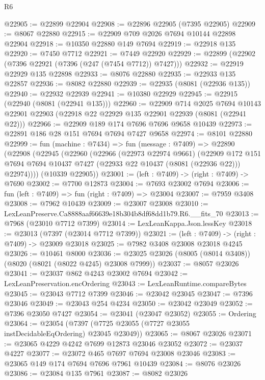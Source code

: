 \begin{lexlean}{R6}
\begin{coremodule}
@22905 := @22899 @22904
@22908 := @22896 @22905 (@7395 @22905)
@22909 := @8067 @22880
@22915 := @22909 @709 @2026 @7694 @10144 @22898 @22904
@22918 := @10350 @22880 @149 @7694
@22919 := @22918 @135
@22920 := @7450 @7712
@22921 := @7449 @22920
@22929 := @22899 (@22902 (@7396 @22921 (@7396 (@247 (@7454 @7712)) @7427)))
@22932 := @22919 @22929 @135 @22898
@22933 := @8076 @22880
@22935 := @22933 @135 @22857
@22936 := @8082 @22880
@22939 := @22935 (@8081 (@22936 @135))
@22940 := @22932 @22939
@22941 := @10380 @22929
@22945 := @22915 (@22940 (@8081 (@22941 @135)))
@22960 := @22909
    @714
    @2025
    @7694
    @10143
    @22901
    @22903
    (@22918 @22 @22929 @135 @22901 @22939 (@8081 (@22941 @22)))
@22966 := @22909 @189 @174 @7696 @7696 @9658 @10439
@22973 := @22891 @186 @28 @151 @7694 @7694 @7427 @9658
@22974 := @8101 @22880
@22999 := fun (machine : @7434) =>
  fun (message : @7409) =>
  @22890
    (@22908
      (@22945
        (@22960
          (@22966
            (@22973 @22974 @9661)
            (@22909
              @172
              @151
              @7694
              @7694
              @10437
              @7427
              (@22933 @22 @10437 (@8081 (@22936 @22)))
              @22974))))
      (@10339 @22905))
@23001 := (left : @7409) -> (right : @7409) -> @7690
@23002 := @7700 @12873
@23004 := @7693 @23002 @7694
@23006 := fun (left : @7409) => fun (right : @7409) => @23004
@23007 := @7959 @3408
@23008 := @7962 @10439
@23009 := @23007 @23008
@23010 := LexLeanPreserve.Ca8888aaf66639e18b304b8df68dd1b79.R6.__fits_70
@23013 := @7968 (@23010 @7712 @7399)
@23014 := LexLeanKappa.Json.lessKey
@23018 := @23013 (@7397 (@23014 @7712 @7399))
@23021 := (left : @7409) -> (right : @7409) -> @23009 @23018
@23025 := @7982 @3408 @23008 @23018 @4245
@23026 := @10461 @8000
@23036 := @23025 @23026 (@8005 (@8014 @3408)) (@8020 (@8021 (@8022 @4245) @23008 @7999))
@23037 := @8057 @23026
@23041 := @23037 @862 @4243 @23002 @7694
@23042 := LexLeanPreservation.encOrdering
@23043 := LexLeanRuntime.compareBytes
@23045 := @23043 @7712 @7399
@23046 := @23042 @23045
@23047 := @7396 @23046
@23049 := @23043 @254 @4234
@23050 := @23042 @23049
@23052 := @7396 @23050 @7427
@23054 := @23041 (@23047 @23052)
@23055 := Ordering
@23064 := @23054 (@7397 (@7725 @23055 (@7727 @23055 instDecidableEqOrdering) @23045 @23049))
@23065 := @8067 @23026
@23071 := @23065 @4229 @4242 @7699 @12873 @23046 @23052
@23072 := @23037 @4227
@23077 := @23072 @465 @7697 @7694 @23008 @23046
@23083 := @23065 @149 @174 @7694 @7696 @7961 @10439
@23084 := @8076 @23026
@23086 := @23084 @135 @7961
@23087 := @8082 @23026

\end{coremodule}
\end{lexlean}

